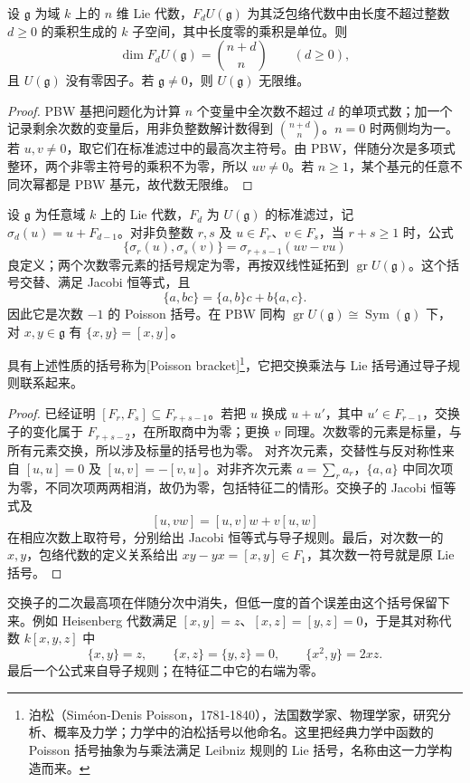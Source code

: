 \begin{corollary}\label{b5:cor:pbw-dimension-domain}
	设 \(\mathfrak g\) 为域 \(k\) 上的 \(n\) 维 Lie 代数，\(F_dU(\mathfrak g)\) 为其泛包络代数中由长度不超过整数 \(d\ge0\) 的乘积生成的 \(k\) 子空间，其中长度零的乘积是单位。则
	\[
		\dim F_dU(\mathfrak g)=\binom{n+d}{n}\qquad(d\ge0),
	\]
	且 \(U(\mathfrak g)\) 没有零因子。若 \(\mathfrak g\ne0\)，则 \(U(\mathfrak g)\) 无限维。
\end{corollary}
\begin{proof}
	PBW 基把问题化为计算 \(n\) 个变量中全次数不超过 \(d\) 的单项式数；加一个记录剩余次数的变量后，用非负整数解计数得到 \(\binom{n+d}{n}\)。\(n=0\) 时两侧均为一。 若 \(u,v\ne0\)，取它们在标准滤过中的最高次主符号。由 PBW，伴随分次是多项式整环，两个非零主符号的乘积不为零，所以 \(uv\ne0\)。若 \(n\ge1\)，某个基元的任意不同次幂都是 PBW 基元，故代数无限维。
\end{proof}
\begin{proposition}\label{b5:prop:pbw-poisson}
	设 \(\mathfrak g\) 为任意域 \(k\) 上的 Lie 代数，\(F_d\) 为 \(U(\mathfrak g)\) 的标准滤过，记 \(\sigma_d(u)=u+F_{d-1}\)。对非负整数 \(r,s\) 及 \(u\in F_r\)、\(v\in F_s\)，当 \(r+s\ge1\) 时，公式
	\[
		\{\sigma_r(u),\sigma_s(v)\} =\sigma_{r+s-1}(uv-vu)
	\]
	良定义；两个次数零元素的括号规定为零，再按双线性延拓到 \(\operatorname{gr}U(\mathfrak g)\)。这个括号交替、满足 Jacobi 恒等式，且
	\[
		\{a,bc\}=\{a,b\}c+b\{a,c\}.
	\]
	因此它是次数 \(-1\) 的 Poisson 括号。在 PBW 同构 \(\operatorname{gr}U(\mathfrak g)\cong\operatorname{Sym}(\mathfrak g)\) 下，对 \(x,y\in\mathfrak g\) 有 \(\{x,y\}=[x,y]\)。
\end{proposition}
具有上述性质的括号称为[Poisson bracket]\footnote{泊松（Siméon-Denis Poisson，1781-1840），法国数学家、物理学家，研究分析、概率及力学；力学中的泊松括号以他命名。这里把经典力学中函数的 Poisson 括号抽象为与乘法满足 Leibniz 规则的 Lie 括号，名称由这一力学构造而来。}，它把交换乘法与 Lie 括号通过导子规则联系起来。
\begin{proof}
	已经证明 \([F_r,F_s]\subseteq F_{r+s-1}\)。若把 \(u\) 换成 \(u+u'\)，其中 \(u'\in F_{r-1}\)，交换子的变化属于 \(F_{r+s-2}\)，在所取商中为零；更换 \(v\) 同理。次数零的元素是标量，与所有元素交换，所以涉及标量的括号也为零。 对齐次元素，交替性与反对称性来自 \([u,u]=0\) 及 \([u,v]=-[v,u]\)。对非齐次元素 \(a=\sum_r a_r\)，\(\{a,a\}\) 中同次项为零，不同次项两两相消，故仍为零，包括特征二的情形。交换子的 Jacobi 恒等式及
	\[
		[u,vw]=[u,v]w+v[u,w]
	\]
	在相应次数上取符号，分别给出 Jacobi 恒等式与导子规则。最后，对次数一的 \(x,y\)，包络代数的定义关系给出 \(xy-yx=[x,y]\in F_1\)，其次数一符号就是原 Lie 括号。
\end{proof}
交换子的二次最高项在伴随分次中消失，但低一度的首个误差由这个括号保留下来。例如 Heisenberg 代数满足 \([x,y]=z\)、\([x,z]=[y,z]=0\)，于是其对称代数 \(k[x,y,z]\) 中
\[
	\{x,y\}=z,\qquad \{x,z\}=\{y,z\}=0, \qquad \{x^2,y\}=2xz.
\]
最后一个公式来自导子规则；在特征二中它的右端为零。

